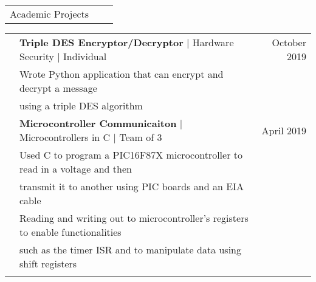\documentclass[letterpaper,10pt,oneside]{article}
\begin{document}
 \noindent \begin{tabularx}{\linewidth}{@{} l l R } 
     \Large{Academic Projects}\\
 \end{tabularx}
 \noindent \begin{tabularx}{\linewidth}{@{} l l R } 
     & \textbf{Triple DES Encryptor/Decryptor} $\mid$ Hardware Security $\mid$ Individual & October 2019 \\
     &Wrote Python application that can encrypt and decrypt a message\\
     &\indent using a triple DES algorithm\\
     & \textbf{Microcontroller Communicaiton} $\mid$ Microcontrollers in C $\mid$ Team of 3 & April 2019 \\
     &  Used C to program a PIC16F87X microcontroller to read in a voltage and then \\
     &\indent transmit it to another using PIC boards and an EIA cable \\
     & Reading and writing out to microcontroller's registers to enable functionalities \\
     &\indent such as the timer ISR and to manipulate data using shift registers\\
     \\
\end{tabularx}
\end{document}
